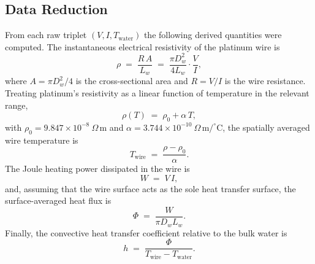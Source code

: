 \documentclass[conference]{IEEEtran}
\begin{document}
\subsection{Data Reduction}
From each raw triplet $(V,I,T_{\mathrm{water}})$ the following derived quantities were computed. The instantaneous electrical resistivity of the platinum wire is
\begin{equation}
\rho \;=\; \frac{R\,A}{L_w} \;=\; \frac{\pi D_w^{2}}{4 L_w}\cdot\frac{V}{I},
\label{eq:rho}
\end{equation}
where $A = \pi D_w^2/4$ is the cross-sectional area and $R = V/I$ is the wire resistance. Treating platinum's resistivity as a linear function of temperature in the relevant range,
\begin{equation}
\rho(T) \;=\; \rho_{0} + \alpha\,T,
\label{eq:rhoT}
\end{equation}
with $\rho_{0} = 9.847\times10^{-8}~\Omega\,\mathrm{m}$ and $\alpha = 3.744\times10^{-10}~\Omega\,\mathrm{m}/^{\circ}\mathrm{C}$, the spatially averaged wire temperature is
\begin{equation}
T_{\mathrm{wire}} \;=\; \frac{\rho - \rho_{0}}{\alpha}.
\label{eq:Twire}
\end{equation}
The Joule heating power dissipated in the wire is
\begin{equation}
W \;=\; V\,I,
\label{eq:W}
\end{equation}
and, assuming that the wire surface acts as the sole heat transfer surface, the surface-averaged heat flux is
\begin{equation}
\Phi \;=\; \frac{W}{\pi D_w L_w}.
\label{eq:flux}
\end{equation}
Finally, the convective heat transfer coefficient relative to the bulk water is
\begin{equation}
h \;=\; \frac{\Phi}{T_{\mathrm{wire}} - T_{\mathrm{water}}}.
\label{eq:HTC}
\end{equation}
\end{document}
